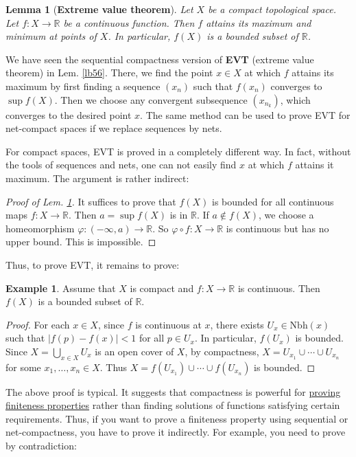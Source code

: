 \documentclass[12pt,b5paper,notitlepage]{article}
\theoremstyle{definition}
\newtheorem{eg}[df]{Example}
\theoremstyle{plain}
\newtheorem{lm}[df]{Lemma}
\newcommand{\Rbb}{\mathbb R}
\newcommand{\Nbh}{\mathrm{Nbh}}
\numberwithin{equation}{section}
\begin{document}
\begin{lm}[\textbf{Extreme value theorem}]\label{lb224} 
Let $X$ be a compact topological space. Let $f:X\rightarrow\Rbb$ be a continuous function. Then $f$ attains its maximum and minimum at points of $X$. In particular, $f(X)$ is a bounded subset of $\Rbb$.
\end{lm}



We have seen the sequential compactness version of \textbf{EVT} (extreme value theorem) in Lem. \ref{lb56}. There, we find the point $x\in X$ at which $f$ attains its maximum by first finding a sequence $(x_n)$ such that $f(x_n)$ converges to $\sup f(X)$. Then we choose any convergent subsequence $(x_{n_k})$, which converges to the desired point $x$. The same method can be used to prove EVT for net-compact spaces if we replace sequences by nets.


For compact spaces, EVT is proved in a completely different way. In fact, without the tools of sequences and nets, one can not easily find $x$ at which $f$ attains it maximum. The argument is rather indirect:

\begin{proof}[Proof of Lem. \ref{lb224}]
It suffices to prove that $f(X)$ is bounded for all continuous maps $f:X\rightarrow\Rbb$. Then $a=\sup f(X)$ is in $\Rbb$. If $a\notin f(X)$, we choose a homeomorphism $\varphi:(-\infty,a)\rightarrow\Rbb$. So $\varphi\circ f:X\rightarrow\Rbb$ is  continuous but has no upper bound. This is impossible.
\end{proof}

Thus, to prove EVT, it remains to prove:
\begin{eg}\label{lb227}
Assume that $X$ is compact and $f:X\rightarrow\Rbb$ is continuous. Then $f(X)$ is a bounded subset of $\Rbb$.
\end{eg}

\begin{proof}
For each $x\in X$, since $f$ is continuous at $x$, there exists $U_x\in\Nbh(x)$ such that $|f(p)-f(x)|<1$ for all $p\in U_x$. In particular, $f(U_x)$ is bounded. Since $X=\bigcup_{x\in X}U_x$ is an open cover of $X$, by compactness, $X=U_{x_1}\cup\cdots\cup U_{x_n}$ for some $x_1,\dots,x_n\in X$. Thus $X= f(U_{x_1})\cup\cdots\cup f(U_{x_n})$ is bounded.
\end{proof}



The above proof is typical. It suggests that compactness is powerful for \uline{proving finiteness properties} rather than finding solutions of functions satisfying certain requirements. Thus, if you want to prove a finiteness property using sequential or net-compactness, you have to prove it indirectly. For example, you need to prove by contradiction:
\end{document}
